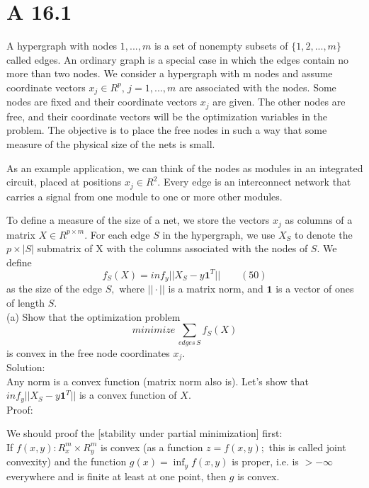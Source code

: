 \documentclass{article}
\begin{document}
\section*{A 16.1} %

A hypergraph with nodes $1, . . . , m$ is a set of nonempty subsets of $\{1, 2, ... , m\} $ called edges. An ordinary graph is a special case in which the edges contain no more than two nodes. We consider a hypergraph with m nodes and assume coordinate vectors $x_j \in R^p, \, j = 1, ... , m $ are
associated with the nodes. Some nodes are fixed and their coordinate vectors $x_j$ are given. The other nodes are free, and their coordinate vectors will be the optimization variables in the problem. The objective is to place the free nodes in such a way that some measure of the physical size of the nets is small.

As an example application, we can think of the nodes as modules in an integrated circuit, placed at positions $x_j \in R^2.$
Every edge is an interconnect network that carries a signal from one module to one or more other modules. 

To define a measure of the size of a net, we store the vectors $x_j$ as columns of a matrix $X \in R^{p \times m}.$ For each edge $S$ in the hypergraph, we use $X_S$ to denote the 
$ p \times |S|$ submatrix of X with the
columns associated with the nodes of $S$. We define
$$ f_S(X) = inf_y ||X_S - y \boldsymbol{1}^T || \qquad (50) $$
as the size of the edge $S,$ where $|| \cdot ||$ 
is a matrix norm, and $\boldsymbol{1}$ is a vector of ones of length $S$.\\

(a) Show that the optimization problem\\
$$ minimize \, \sum_{edges \, S} f_S(X)$$
is convex in the free node coordinates $x_j.$\\

Solution: \\

Any norm is a convex function (matrix norm also is).
Let's show that $inf_y ||X_S - y \boldsymbol{1}^T ||$ is a convex function of $X$.\\

Proof:

We should proof the [stability under partial minimization] first:\\
If $f(x, y) : R^m_x \times R^m_y$ is convex 
(as a function $z = f(x, y);$ this is called joint convexity) and the function $g(x)= \inf_y f(x, y)$ is proper, i.e. is 
$> - \infty$ everywhere and is finite at least at one point, then $g$ is convex.
\end{document}
